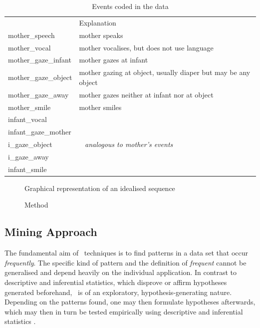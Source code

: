 \begin{table}[h]
	\centering
	\begin{tabularx}{\textwidth}{>{\ttfamily}lX} 
		\toprule
		{\rmfamily Event}		& Explanation \\
		\cmidrule(lr){1-1} \cmidrule(lr){2-2}
		mother\_speech			& mother speaks \\
		mother\_vocal			& mother vocalises, but does not use language \\
		mother\_gaze\_infant	& mother gazes at infant \\
		mother\_gaze\_object	& mother gazing at object, usually diaper but may be any object \\
		mother\_gaze\_away		& mother gazes neither at infant nor at object \\
		mother\_smile			& mother smiles \\
		\cmidrule(lr){1-1} \cmidrule(lr){2-2}
		infant\_vocal \\
		infant\_gaze\_mother \\
		i\_gaze\_object			& ~ \hfill \textit{analogous to mother's events} \hfill ~ \\
		i\_gaze\_away \\
		infant\_smile \\
		\bottomrule
	\end{tabularx}
	\caption{Events coded in the data}
	\label{tab:events}
\end{table}

\begin{figure}
	\centering
	
	\caption{Graphical representation of an idealised sequence}
	\label{fig:idealseq}
\end{figure}

\begin{figure}
	\centering
	
	\caption{Method}
	\label{fig:method}
\end{figure}

\subsection{Mining Approach}
\label{ssec:miningmethodapproach}
The fundamental aim of \fpmlower\ techniques is to find patterns in a data set that occur \emph{frequently}. The specific kind of pattern and the definition of \emph{frequent} cannot be generalised and depend heavily on the individual application. In contrast to descriptive and inferential statistics, which disprove or affirm hypotheses generated beforehand, \fpmlower\ is of an exploratory, hypothesis-generating nature. Depending on the patterns found, one may then formulate hypotheses afterwards, which may then in turn be tested empirically using descriptive and inferential statistics \cite[]{rohlfing18,han12}.%

